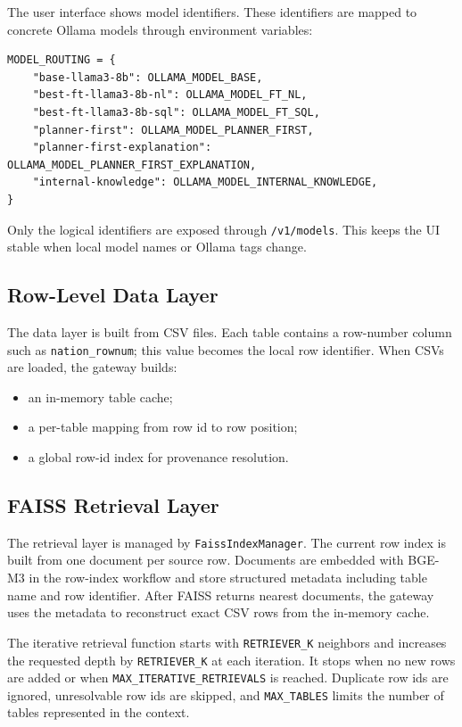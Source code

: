 \documentclass[11pt,a4paper]{article}
\begin{document}
The user interface shows model identifiers. These identifiers are
mapped to concrete Ollama models through environment variables:

\begin{lstlisting}[style=codestyle]
MODEL_ROUTING = {
    "base-llama3-8b": OLLAMA_MODEL_BASE,
    "best-ft-llama3-8b-nl": OLLAMA_MODEL_FT_NL,
    "best-ft-llama3-8b-sql": OLLAMA_MODEL_FT_SQL,
    "planner-first": OLLAMA_MODEL_PLANNER_FIRST,
    "planner-first-explanation": OLLAMA_MODEL_PLANNER_FIRST_EXPLANATION,
    "internal-knowledge": OLLAMA_MODEL_INTERNAL_KNOWLEDGE,
}
\end{lstlisting}

Only the logical identifiers are exposed through \texttt{/v1/models}. This keeps
the UI stable when local model names or Ollama tags change.

\subsection{Row-Level Data Layer}

The data layer is built from CSV files. Each table contains
a row-number column such as \texttt{nation\_rownum}; this value becomes the local
row identifier. When CSVs are loaded, the gateway builds:

\begin{itemize}[leftmargin=*]
    \item an in-memory table cache;
    \item a per-table mapping from row id to row position;
    \item a global row-id index for provenance resolution.
\end{itemize}


\subsection{FAISS Retrieval Layer}

The retrieval layer is managed by \texttt{FaissIndexManager}. The current row
index is built from one document per source row. Documents are embedded with
BGE-M3 in the row-index workflow and store structured metadata including table
name and row identifier. After FAISS returns nearest documents, the gateway uses
the metadata to reconstruct exact CSV rows from the in-memory cache.

The iterative retrieval function starts with \texttt{RETRIEVER\_K} neighbors and
increases the requested depth by \texttt{RETRIEVER\_K} at each iteration. It
stops when no new rows are added or when
\texttt{MAX\_ITERATIVE\_RETRIEVALS} is reached. Duplicate row ids are ignored,
unresolvable row ids are skipped, and \texttt{MAX\_TABLES} limits the number of
tables represented in the context.
\end{document}
